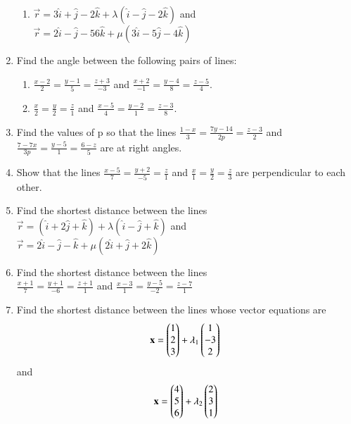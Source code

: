 \begin{enumerate}[label=\thesection.\arabic*,ref=\thesection.\theenumi]
\begin{enumerate}
\item   $\overrightarrow{r}=3\hat{i}+\hat{j}-2\hat{k}+\lambda(\hat{i}-\hat{j}-2\hat{k})$ and\\ $\overrightarrow{r}=2\hat{i}-\hat{j}-56\hat{k}+\mu(3\hat{i}-5\hat{j}-4\hat{k})$ 
\end{enumerate}
\item Find the angle between the following pairs of lines:
\begin{enumerate}
\item $ \frac{x-2}{2}=\frac{y-1}{5}=\frac{z+3}{-3}$ and $ \frac{x+2}{-1}=\frac{y-4}{8}=\frac{z-5}{4}$.
\item $ \frac{x}{2}=\frac{y}{2}=\frac{z}{1}$ and $ \frac{x-5}{4}=\frac{y-2}{1}=\frac{z-3}{8}$.
\end{enumerate}
\item Find the values of p so that the lines $ \frac{1-x}{3}=\frac{7y-14}{2p}=\frac{z-3}{2}$ and $ \frac{7-7x}{3p}=\frac{y-5}{1}=\frac{6-z}{5}$ are at right angles.
\item Show that the lines $ \frac{x-5}{7}=\frac{y+2}{-5}=\frac{z}{1}$ and $ \frac{x}{1}=\frac{y}{2}=\frac{z}{3}$ are perpendicular to each other.
	\\
    \solution
		
\item Find the shortest distance between the lines\\  $\overrightarrow{r}=(\hat{i}+2\hat{j}+\hat{k})+\lambda(\hat{i}-\hat{j}+\hat{k})$ and \\$\overrightarrow{r}=2\hat{i}-\hat{j}-\hat{k}+\mu(2\hat{i}+\hat{j}+2\hat{k})$
\item Find the shortest distance between the lines\\
$ \frac{x+1}{7}=\frac{y+1}{-6}=\frac{z+1}{1}$ and $ \frac{x-3}{1}=\frac{y-5}{-2}=\frac{z-7}{1}$ 
    \solution
		
    \item Find the shortest distance between the lines whose vector equations are
    \begin{align}
        \mathbf{x} = \begin{pmatrix}1\\2\\3\end{pmatrix} + \lambda_1\begin{pmatrix}1\\-3\\2\end{pmatrix}
        \label{eq:chapters/12/11/2/16/L1}
    \end{align}
    and
    \begin{align}
        \vec{x} = \myvec{4\\5\\6} + \lambda_2\myvec{2\\3\\1}

\end{align}
\end{enumerate}
